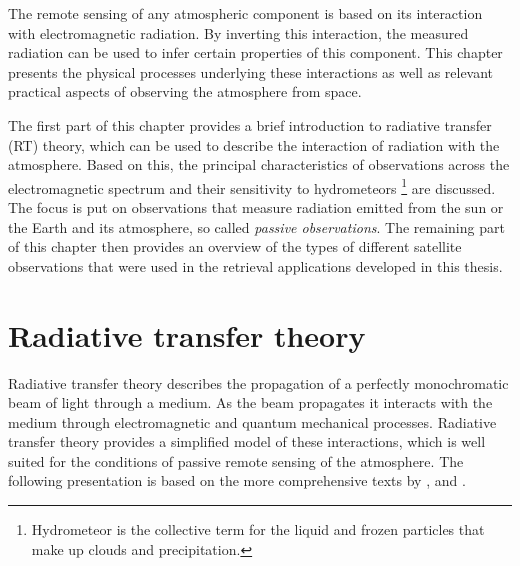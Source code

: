 
The remote sensing of any atmospheric component is based on its interaction with
electromagnetic radiation. By inverting this interaction, the measured radiation
can be used to infer certain properties of this component. This chapter presents
the physical processes underlying these interactions as well as relevant
practical aspects of observing the atmosphere from space.

The first part of this chapter provides a brief introduction to radiative
transfer (RT) theory, which can be used to describe the interaction of radiation
with the atmosphere. Based on this, the principal characteristics of
observations across the electromagnetic spectrum and their sensitivity to
hydrometeors%
%
\footnote{ Hydrometeor is the collective term for the liquid and frozen particles that make
up clouds and precipitation.}%
%
are discussed. The focus is put on observations that measure radiation emitted
from the sun or the Earth and its atmosphere, so called
\textit{passive observations}.
The remaining part of this chapter then provides an overview of the types of
different satellite observations that were used in the retrieval applications
developed in this thesis.




\section{Radiative transfer theory}

Radiative transfer theory describes the propagation of a perfectly monochromatic
beam of light through a medium. As the beam propagates it interacts with the
medium through electromagnetic and quantum mechanical processes. Radiative
transfer theory provides a simplified model of these interactions, which is well
suited for the conditions of passive remote sensing of the atmosphere. The
following presentation is based on the more comprehensive texts
by \citet{mischenko02}, \citet{thomas02} and \citet{wallace06}.

